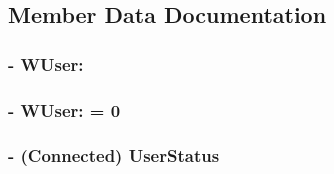 \subsection{Member Data Documentation}
\hypertarget{interface_w_user_a1469e26a4f64967c3602f8ee5ae2acb1}{
\subsubsection[{Connecting}]{\setlength{\rightskip}{0pt plus 5cm}-\/ W\-User\-:\hspace{0.3cm}{\ttfamily [protected]}}}\label{interface_w_user_a1469e26a4f64967c3602f8ee5ae2acb1}
\hypertarget{interface_w_user_aeb586fdedc7737f46fdc62f4db5a13f8}{
\subsubsection[{Not\-Connected}]{\setlength{\rightskip}{0pt plus 5cm}-\/ W\-User\-: = 0\hspace{0.3cm}{\ttfamily [protected]}}}\label{interface_w_user_aeb586fdedc7737f46fdc62f4db5a13f8}
\hypertarget{interface_w_user_a5e79d8246a2ab96a7280c1d7aa5819d5}{
\subsubsection[{User\-Status}]{\setlength{\rightskip}{0pt plus 5cm}-\/ (Connected) User\-Status\hspace{0.3cm}{\ttfamily [protected]}}}\label{interface_w_user_a5e79d8246a2ab96a7280c1d7aa5819d5}


